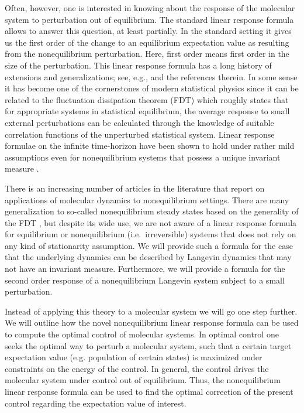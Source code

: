 \documentclass[]{tMPH2e}
\begin{document}
Often, however, one is interested in knowing about the response of the molecular system to perturbation out of equilibrium. The standard linear response formula allows to answer this question, at least partially. In the standard setting it gives us the first order of the change to an equilibrium expectation value as resulting from the nonequilibrium perturbation. Here, first order means first order in the size of the perturbation. This linear response formula has a long history of extensions and generalizations; see, e.g., \cite{marconi2008,ruelle2009} and the references therein. In some sense it has become one of the cornerstones of modern statistical physics since it can be related to the fluctuation dissipation theorem (FDT) which roughly states that for appropriate systems in statistical equilibrium, the average response to small external perturbations can be calculated through the knowledge of suitable correlation functions of the unperturbed statistical system. Linear response formulae on the infinite time-horizon have been shown to hold under rather mild assumptions even for nonequilibrium systems that possess a unique invariant measure \cite{hairer2008}. 

There is an increasing number of articles in the literature that report on applications of molecular dynamics to nonequilibrium settings. There are many generalization to so-called nonequilibrium steady states based on the generality of the FDT \cite{Seifert}, but despite its wide use, we are not aware of a linear response formula for equilibrium or nonequilibrium (i.e.~irreversible) systems that does not rely on any kind of stationarity assumption. We will provide such a formula for the case that the underlying dynamics can be described by Langevin dynamics that may not have an invariant measure. Furthermore, we will provide a formula for the second order response of a nonequilibrium Langevin system subject to a small perturbation.

Instead of applying this theory to a molecular system we will go one step further. We will outline how the novel nonequilibrium linear response formula can be used to compute the optimal control of molecular systems. In optimal control one seeks the optimal way to perturb a molecular system, such that a certain target expectation value (e.g. population of certain states) is maximized under constraints on the energy of the control. In general, the control drives the molecular system under control out of equilibrium. Thus, the nonequilibrium linear response formula can be used to find the optimal correction of the present control regarding the expectation value of interest. 
\end{document}

